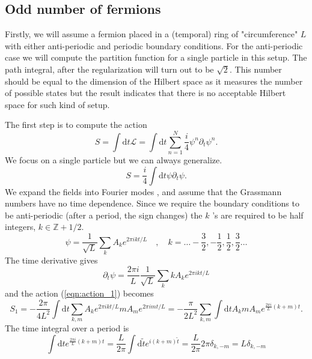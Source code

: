 \documentclass[12pt,a4paper]{article}
\begin{document}
\subsection{Odd number of fermions}
Firstly, we will assume a fermion placed in a (temporal) ring of "circumference" $ L $ with either anti-periodic and periodic boundary conditions. For the anti-periodic case we will compute the partition function for a single particle in this setup. The path integral, after the regularization  will turn out to be $ \sqrt{ 2 } $. This number should be equal to the dimension of the Hilbert space as it measures the number of possible states but the result indicates that there is no acceptable Hilbert space for such kind of setup.

The first step is to compute the action
\begin{equation}
	S = \int \mathrm{d} t \mathcal{ L } = \int \mathrm{d} t \sum_{n=1}^{N} \frac{ i }{ 4 } \psi ^n \partial _t \psi ^n.
	\label{eqn:action}
\end{equation}
We focus on a single particle but we can always generalize.
\begin{equation}
	S = \frac{ i }{ 4 }  \int \mathrm{d} t	\psi \partial_t \psi .
	\label{eqn:action_1}
\end{equation}
We expand the fields into Fourier modes \cite{PhilipBoyleSmith2021},\cite{Berezin1977} and assume that the Grassmann numbers have no time dependence. Since we require the boundary conditions to be anti-periodic (after a period, the sign changes) the $ k $ 's are required to be half integers, $ k \in \mathbb{ Z } +1/2 $.
\begin{equation}
	\psi = \frac{ 1 }{ \sqrt{L} } \sum_{k}^{} A_k e ^{ 2 \pi i k t/L } \quad,\quad k = \dots - \frac{ 3 }{ 2 } ,- \frac{ 1 }{ 2 } , \frac{ 1 }{ 2 } , \frac{ 3 }{ 2 } \dots
\end{equation}
The time derivative gives
\begin{equation*}
	\partial _t \psi = \frac{ 2 \pi i  }{ L } \frac{ 1 }{ \sqrt{ L }  } \sum_{k}^{} k A_k e ^{ 2 \pi i k t/L }
\end{equation*}
and the action (\ref{eqn:action_1}) becomes
\begin{equation*}
	S_1 = - \frac{ 2 \pi  }{ 4 L^2 } \int \mathrm{d} t \sum_{k,m}^{} A_k e ^{ 2 \pi i k t/L } m A_m e ^{ 2 \pi i m t/L } = - \frac{ \pi  }{ 2 L^2 } \sum_{k,m}^{} \int \mathrm{d} t A_k m A_m e ^{ \frac{ 2 \pi i }{ L } (k+m) t } .
\end{equation*}
The time integral over a period is
\begin{equation*}
	\int \mathrm{d} t e ^{ \frac{ 2 \pi i }{ L } (k+m) t } = \frac{ L }{ 2 \pi  } \int \mathrm{d}\tilde{t} e ^{ i (k+m) \tilde{t} } = \frac{ L }{ 2 \pi  } 2 \pi \delta _{ k,-m } = L \delta _{ k,-m } 
\end{equation*}
\end{document}

